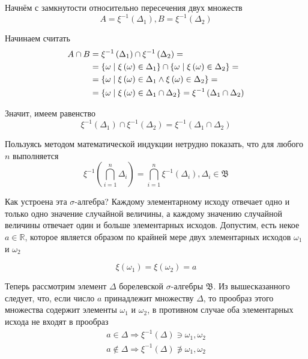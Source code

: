 \begin{enumerate}
      Начнём с замкнутости относительно пересечения двух множеств
      $$A= \xi^{-1}\left( \Delta_1 \right), B= \xi^{-1}\left( \Delta_2 \right)$$

      Начинаем считать
      \begin{align*}
      A \cap B
          &= \xi^{-1}\left( \Delta_1 \right)
        \cap \xi^{-1}\left( \Delta_2 \right) = \\
          &= \left\{ \omega \;\middle|\; \xi\left( \omega \right)
        \in \Delta_1 \right\}
        \cap \left\{ \omega \;\middle|\; \xi\left( \omega \right)
            \in \Delta_2 \right\} = \\
          &= \left\{ \omega \;\middle|\; \xi\left( \omega \right) \in \Delta_1
        \wedge \xi\left( \omega \right) \in \Delta_2 \right\} = \\
          &= \left\{ \omega \;\middle|\; \xi\left( \omega \right)
        \in \Delta_1 \cap \Delta_2 \right\}
          = \xi^{-1}\left( \Delta_1 \cap \Delta_2 \right)
      \end{align*}

      Значит, имеем равенство
      $$\xi^{-1}\left( \Delta_1 \right) \cap \xi^{-1}\left( \Delta_2 \right)
      = \xi^{-1}\left( \Delta_1 \cap \Delta_2 \right)$$

      Пользуясь методом математической индукции нетрудно показать,
      что для любого $n$ выполняется
      $$\xi^{-1}\left( \bigcap_{i=1}^n \Delta_i  \right)
      = \bigcap_{i=1}^n \xi^{-1}\left( \Delta_i \right),
          \Delta_i \in \mathfrak{B}$$
\end{enumerate}

Как устроена эта $\sigma$-алгебра?
Каждому элементарному исходу отвечает одно и только одно значение
случайной величины, а каждому значению случайной величины
отвечает один и больше элементарных исходов.
Допустим, есть некое $a\in\mathbb{R}$, которое является образом по крайней мере
двух элементарных исходов $\omega_1$ и $\omega_2$

$$\xi\left( \omega_1 \right) = \xi\left( \omega_2 \right) = a$$

Теперь рассмотрим элемент $\Delta$ борелевской $\sigma$-алгебры $\mathfrak{B}$.
Из вышесказанного следует, что,
если число $a$ принадлежит множеству $\Delta$, то прообраз этого множества
содержит элементы $\omega_1$ и $\omega_2$,
в противном случае оба элементарных исхода не входят в прообраз
\begin{align*}
  a \in \Delta
      \Rightarrow \xi^{-1}\left( \Delta \right) \ni \omega_1, \omega_2 \\
  a \notin \Delta
      \Rightarrow \xi^{-1}\left( \Delta \right) \not\ni \omega_1, \omega_2 \\
\end{align*}

